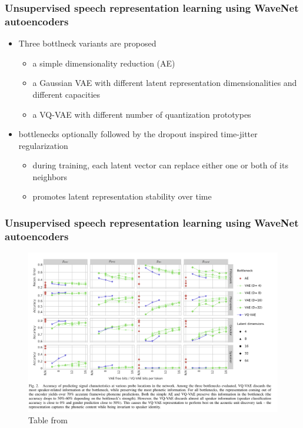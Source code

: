 \documentclass[table]{beamer}
\begin{document}
\begin{frame}
\frametitle{Unsupervised speech representation learning using WaveNet autoencoders}

		\begin{itemize}
			\item Three bottlneck variants are proposed
				\begin{itemize}
				\item a simple dimensionality reduction (AE)
				\item a Gaussian VAE with different latent representation dimensionalities and different capacities
				\item a VQ-VAE with different number of quantization prototypes 
				\end{itemize}		
			\item bottlenecks optionally followed by the dropout inspired time-jitter regularization	
				\begin{itemize}
				\item during training, each latent vector can replace either one or both of its neighbors
				\item promotes latent representation stability over time
				\end{itemize}			
		\end{itemize} 

\end{frame}

\begin{frame}
\frametitle{Unsupervised speech representation learning using WaveNet autoencoders}


		\begin{figure}
			\centering
			\includegraphics[scale=0.22]	{wavnetAEexp} 
			\caption{Table from  \citep{DBLP:journals/corr/abs-1901-08810}}
			\end{figure}

\end{frame}
\end{document}
